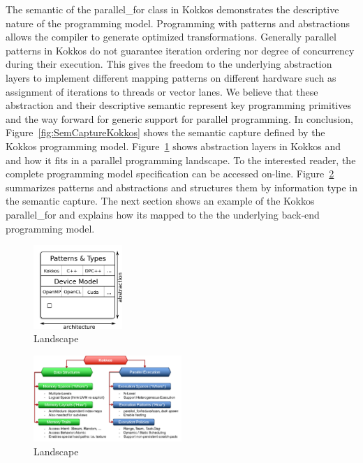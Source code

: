 The semantic of the parallel\_for class in Kokkos demonstrates the descriptive nature of the programming model. Programming with patterns and abstractions allows the compiler to generate optimized transformations. 
Generally parallel patterns in Kokkos do not guarantee iteration ordering nor degree of concurrency during their execution. This gives the freedom to the underlying abstraction layers to implement different mapping patterns on different hardware such as assignment of iterations to threads or vector lanes. We believe that these abstraction and their descriptive semantic represent key programming primitives and the way forward for generic support for parallel programming. In conclusion, Figure~\ref{fig:SemCaptureKokkos} shows the semantic capture defined by the Kokkos programming model. Figure~\ref{fig:stack} shows abstraction layers in Kokkos and and how it fits in a parallel programming landscape.
To the interested reader, the complete programming model specification can be accessed on-line\cite{pub:KOKKOS}. Figure~\ref{fig:abstractions} summarizes patterns and abstractions and structures them by information type in the semantic capture.
The next section shows an example of the Kokkos parallel\_for and explains how its mapped to the the underlying back-end programming model.

\begin{figure}
\centerline{\includegraphics[width=0.3\textwidth]{img/Stack.png}}
\caption{Landscape}
\label{fig:stack}
\end{figure}

\begin{figure}
\centerline{\includegraphics[width=0.5\textwidth]{img/Abstractions.png}}
\caption{Landscape}
\label{fig:abstractions}
\end{figure}

